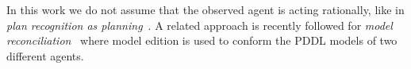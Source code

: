 \documentclass[letterpaper]{article} %
\begin{document}
In this work we do not assume that the observed agent is acting rationally, like in {\em plan recognition as planning}~\cite{ramirez2012plan,ramirez2009plan}. A related approach is recently followed for {\em model reconciliation}~\cite{Kambhampati:mreconciliation:ijcai17} where model edition is used to conform the PDDL models of two different agents. 



\end{document}
